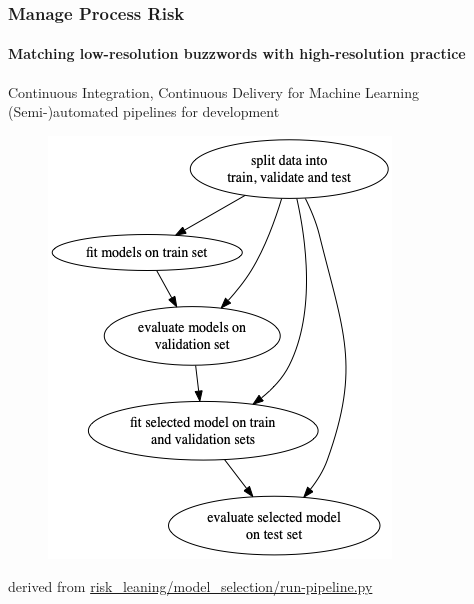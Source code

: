 \begin{frame}
    \frametitle{Manage Process Risk}
    \framesubtitle{Matching low-resolution buzzwords with high-resolution practice}

    \begin{block}{Continuous Integration, Continuous Delivery for Machine Learning}
        (Semi-)automated pipelines for development
        \begin{figure}[ht]
            \includegraphics[height=0.5\textheight]{graphics/ml_pipeline}
        \end{figure}
        derived from \href{https://github.com/munichpavel/risk-ai-workshop/blob/main/risk_learning/model_selection/run-pipeline.py}{risk\_leaning/model\_selection/run-pipeline.py}
    \end{block}
\end{frame}


